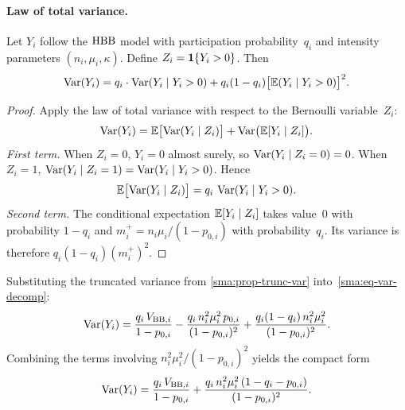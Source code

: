 
\paragraph{Law of total variance.}

\begin{proposition}
\label{sma:prop-var-decomp}
Let $Y_i$ follow the $\operatorname{HBB}$ model
\citep[cf.][for the Poisson hurdle analogue]{Mullahy1986}
with participation probability~$q_i$ and
intensity parameters $(n_i, \mu_i, \kappa)$. Define
$Z_i = \mathbf{1}\{Y_i > 0\}$. Then
\begin{equation}\label{sma:eq-var-decomp}
  \operatorname*{Var}(Y_i)
  = q_i \cdot \operatorname*{Var}(Y_i \mid Y_i > 0)
    + q_i(1-q_i)\bigl[\mathbb{E}(Y_i \mid Y_i > 0)\bigr]^2.
\end{equation}
\end{proposition}

\begin{proof}
Apply the law of total variance with respect to the Bernoulli variable~$Z_i$:
\[
  \operatorname*{Var}(Y_i)
  = \mathbb{E}\bigl[\operatorname*{Var}(Y_i \mid Z_i)\bigr]
    + \operatorname*{Var}\bigl(\mathbb{E}[Y_i \mid Z_i]\bigr).
\]
\emph{First term.}  When $Z_i = 0$, $Y_i = 0$ almost surely, so
$\operatorname*{Var}(Y_i \mid Z_i = 0) = 0$.  When $Z_i = 1$,
$\operatorname*{Var}(Y_i \mid Z_i = 1) = \operatorname*{Var}(Y_i \mid Y_i > 0)$.  Hence
\[
  \mathbb{E}\bigl[\operatorname*{Var}(Y_i \mid Z_i)\bigr]
  = q_i\,\operatorname*{Var}(Y_i \mid Y_i > 0).
\]
\emph{Second term.}  The conditional expectation $\mathbb{E}[Y_i \mid Z_i]$ takes
value~$0$ with probability $1-q_i$ and $m_i^{+} = n_i\mu_i/(1-p_{0,i})$
with probability~$q_i$.  Its variance is therefore
$q_i(1-q_i)(m_i^{+})^2$.
\end{proof}

\begin{corollary}\label{sma:cor-var-expanded}
Substituting the truncated variance from
\cref{sma:prop-trunc-var} into~\eqref{sma:eq-var-decomp}:
\begin{equation}\label{sma:eq-var-expanded}
  \operatorname*{Var}(Y_i)
  = \frac{q_i\, V_{\textup{BB},i}}{1-p_{0,i}}
    - \frac{q_i\, n_i^2 \mu_i^2\, p_{0,i}}{(1-p_{0,i})^2}
    + \frac{q_i(1-q_i)\, n_i^2 \mu_i^2}{(1-p_{0,i})^2}.
\end{equation}
Combining the terms involving $n_i^2\mu_i^2/(1-p_{0,i})^2$ yields the
compact form
\begin{equation}\label{sma:eq-var-compact}
  \operatorname*{Var}(Y_i)
  = \frac{q_i\, V_{\textup{BB},i}}{1-p_{0,i}}
    + \frac{q_i\, n_i^2\mu_i^2\,(1-q_i-p_{0,i})}{(1-p_{0,i})^2}.
\end{equation}
\end{corollary}

